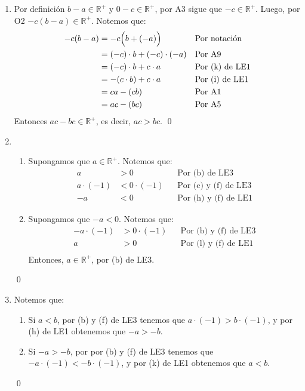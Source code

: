 \documentclass[11pt]{article}
\begin{document}
\begin{enumerate}[label=\alph*),font=\bfseries]

    \item Por definición $b-a \in \mathbb{R}^+$ y $0 - c \in \mathbb{R}^+$, por A3 sigue que $ -c \in \mathbb{R}^+$. Luego, por O2 $-c(b-a) \in \mathbb{R}^+$. Notemos que:
    \begin{align*}
        -c(b-a) &= -c \Bigl( b + (-a) \Bigr) && \text{Por notación}\\
        &= (-c) \cdot b + (-c) \cdot (-a) && \text{Por A9}\\
        &= (-c) \cdot b + c \cdot a && \text{Por (k) de LE1}\\
        &= -(c \cdot b) + c \cdot a && \text{Por (i) de LE1}\\
        &= ca -(cb) && \text{Por A1}\\
        &= ac - (bc) && \text{Por A5}\\
    \end{align*}
    Entonces $ac - bc \in \mathbb{R}^+$, es decir, $ac>bc$. \qed


    \item
    \begin{enumerate}[label=\roman*),font=\bfseries]
    \item Supongamos que $a \in \mathbb{R}^+$. Notemos que:
    \begin{align*}
        a &> 0 && \text{Por (b) de LE3}\\
        a \cdot (-1) &< 0 \cdot (-1) && \text{Por (c) y (f) de LE3}\\
        -a &< 0 && \text{Por (h) y (f) de LE1}
    \end{align*}
    \item Supongamos que $-a<0$. Notemos que:
    \begin{align*}
        -a \cdot (-1) &> 0 \cdot (-1) && \text{Por (b) y (f) de LE3}\\
        a &> 0 && \text{Por (l) y (f) de LE1}\\
    \end{align*}
    Entonces, $a \in \mathbb{R}^+$, por (b) de LE3.
    \end{enumerate}
    \qed


    \item Notemos que:
    \begin{enumerate}[label=\roman*),font=\bfseries]
        \item Si $a<b$, por (b) y (f) de LE3 tenemos que $a \cdot (-1) > b \cdot (-1)$, y por (h) de LE1 obtenemos que $-a > -b$.
        \item Si $-a > -b$, por por (b) y (f) de LE3 tenemos que $-a \cdot (-1) < -b \cdot (-1)$, y por (k) de LE1 obtenemos que $a<b$.
    \end{enumerate}
    \qed


\end{enumerate}
\end{document}
